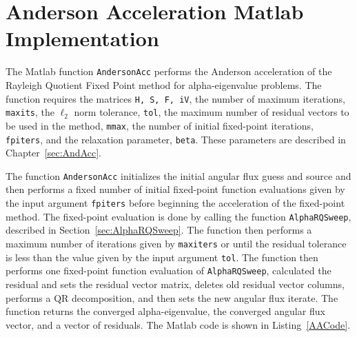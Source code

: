\clearpage

\section{Anderson Acceleration Matlab Implementation}

The Matlab function \texttt{AndersonAcc} performs the Anderson acceleration of the Rayleigh Quotient Fixed Point method for alpha-eigenvalue problems. The function requires the matrices \texttt{H, S, F, iV}, the number of maximum iterations, \texttt{maxits}, the $\ell_{2}$ norm tolerance, \texttt{tol}, the maximum number of residual vectors to be used in the method, \texttt{mmax}, the number of initial fixed-point iterations, \texttt{fpiters}, and the relaxation parameter, \texttt{beta}. These parameters are described in Chapter~\ref{sec:AndAcc}.

The function \texttt{AndersonAcc} initializes the initial angular flux guess and source and then performs a fixed number of initial fixed-point function evaluations given by the input argument \texttt{fpiters} before beginning the acceleration of the fixed-point method. The fixed-point evaluation is done by calling the function \texttt{AlphaRQSweep}, described in Section~\ref{sec:AlphaRQSweep}. The function then performs a maximum number of iterations given by \texttt{maxiters} or until the residual tolerance is less than the value given by the input argument \texttt{tol}. The function then performs one fixed-point function evaluation of \texttt{AlphaRQSweep}, calculated the residual and sets the residual vector matrix, deletes old residual vector columns, performs a QR decomposition, and then sets the new angular flux iterate. The function returns the converged alpha-eigenvalue, the converged angular flux vector, and a vector of residuals. The Matlab code is shown in Listing~\ref{AACode}.

